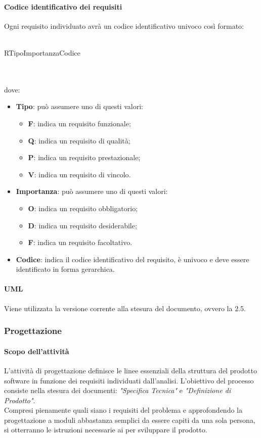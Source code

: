  \paragraph{Codice identificativo dei requisiti}
 Ogni requisito individuato avrà un codice identificativo univoco così formato: \\ \\
 \centerline{R\textbraceleft{}Tipo\textbraceright{}\textbraceleft{}Importanza\textbraceright{}\textbraceleft{}Codice\textbraceright{}}
 \\ \\
 dove:
 \begin{itemize}
 	\item \textbf{Tipo}: può assumere uno di questi valori:
 	\begin{itemize}
 		\item \textbf{F}: indica un requisito funzionale;
 		\item \textbf{Q}: indica un requisito di qualità;
 		\item \textbf{P}: indica un requisito prestazionale;
 		\item \textbf{V}: indica un requisito di vincolo.
 	\end{itemize}
 	\item \textbf{Importanza}: può assumere uno di questi valori:
 	\begin{itemize}
 		\item \textbf{O}: indica un requisito obbligatorio;
 		\item \textbf{D}: indica un requisito desiderabile;
 		\item \textbf{F}: indica un requisito facoltativo.
 	\end{itemize}
 	\item \textbf{Codice}: indica il codice identificativo del requisito, è univoco e deve essere identificato in forma gerarchica.
 \end{itemize}
 \paragraph{UML}
 Viene utilizzata la versione corrente alla stesura del documento, ovvero la 2.5.
 \subsubsection{Progettazione}
 \paragraph{Scopo dell'attività}
 L'attività di progettazione definisce le linee essenziali della struttura del prodotto software in
 funzione dei requisiti individuati dall'analisi. L'obiettivo del processo consiste nella stesura dei
 documenti: \textit{"Specifica Tecnica"} e \textit{"Definizione di Prodotto"}. \\
 Compresi pienamente quali siano i requisiti del problema e approfondendo la progettazione a moduli
 abbastanza semplici da essere capiti da una sola persona, si otterranno le
 istruzioni necessarie ai \PRP{} per sviluppare il prodotto.
